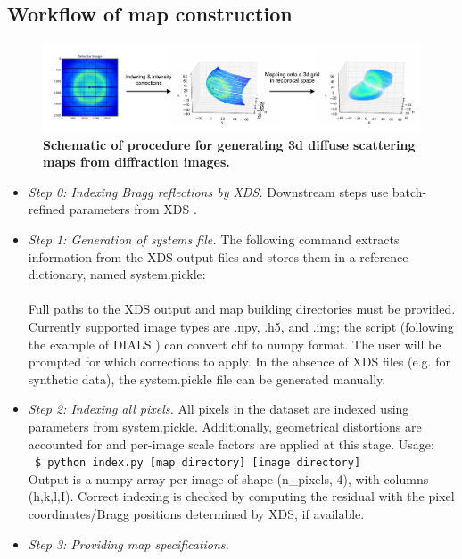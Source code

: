 \documentclass{article}
\begin{document}
\subsection{Workflow of map construction}
\begin{figure}[htb!]
\centering
\includegraphics[width=1.0\textwidth]{figures/workflow.pdf}
\caption{\textbf{Schematic of procedure for generating 3d diffuse scattering maps from diffraction images.} }
\end{figure}
\begin{itemize}
%
\item \emph{Step 0: Indexing Bragg reflections by XDS.} 
Downstream steps use batch-refined parameters from XDS \cite{xds}.
%
\item \emph{Step 1: Generation of systems file.} 
The following command extracts information from the XDS output files and stores them in a reference dictionary, named system.pickle:
\\[0.2cm]
\texttt{ }
\\[0.2cm]
Full paths to the XDS output and map building directories must be provided. Currently supported image types are .npy, .h5, and .img; the \texttt{} script (following the example of DIALS \cite{dials}) can convert cbf to numpy format. The user will be prompted for which corrections to apply. In the absence of XDS files (e.g. for synthetic data), the system.pickle file can be generated manually.
%
\item \emph{Step 2: Indexing all pixels.} 
All pixels in the dataset are indexed using parameters from system.pickle. Additionally, geometrical distortions are accounted for and per-image scale factors are applied at this stage. Usage:
\\[0.2cm]
\texttt{ \$ python index.py [map directory] [image directory]}
\\[0.2cm]
Output is a numpy array per image of shape (n\_pixels, 4), with columns (h,k,l,I). Correct indexing is checked by computing the residual with the pixel coordinates/Bragg positions determined by XDS, if available.
%
\item \emph{Step 3: Providing map specifications.}

\end{itemize}
\end{document}
